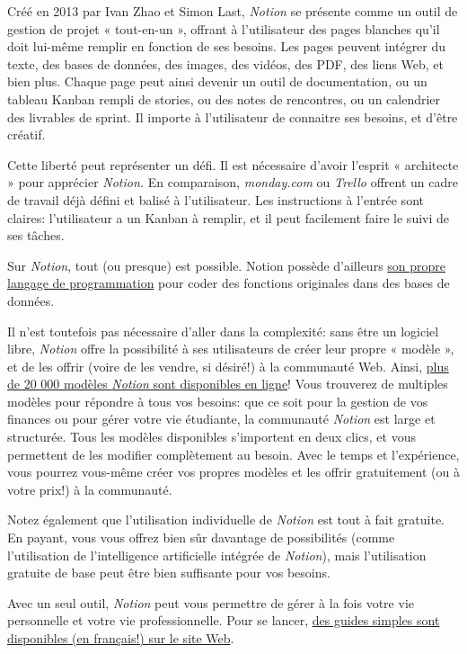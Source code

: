 \documentclass[
  letterpaper,
  DIV=11,
  numbers=noendperiod]{scrreprt}
\begin{document}
Créé en 2013 par Ivan Zhao et Simon Last, \emph{Notion} se présente
comme un outil de gestion de projet « tout-en-un », offrant à
l'utilisateur des pages blanches qu'il doit lui-même remplir en fonction
de ses besoins. Les pages peuvent intégrer du texte, des bases de
données, des images, des vidéos, des PDF, des liens Web, et bien plus.
Chaque page peut ainsi devenir un outil de documentation, ou un tableau
Kanban rempli de stories, ou des notes de rencontres, ou un calendrier
des livrables de sprint. Il importe à l'utilisateur de connaitre ses
besoins, et d'être créatif.

Cette liberté peut représenter un défi. Il est nécessaire d'avoir
l'esprit « architecte » pour apprécier \emph{Notion.} En comparaison,
\emph{monday.com} ou \emph{Trello} offrent un cadre de travail déjà
défini et balisé à l'utilisateur. Les instructions à l'entrée sont
claires: l'utilisateur a un Kanban à remplir, et il peut facilement
faire le suivi de ses tâches.

Sur \emph{Notion}, tout (ou presque) est possible. Notion possède
d'ailleurs \href{https://www.notion.so/fr/help/formulas}{son propre
langage de programmation} pour coder des fonctions originales dans des
bases de données.

Il n'est toutefois pas nécessaire d'aller dans la complexité: sans être
un logiciel libre, \emph{Notion} offre la possibilité à ses utilisateurs
de créer leur propre « modèle », et de les offrir (voire de les vendre,
si désiré!) à la communauté Web. Ainsi,
\href{https://www.notion.so/fr/templates}{plus de 20 000 modèles
\emph{Notion} sont disponibles en ligne}! Vous trouverez de multiples
modèles pour répondre à tous vos besoins: que ce soit pour la gestion de
vos finances ou pour gérer votre vie étudiante, la communauté
\emph{Notion} est large et structurée. Tous les modèles disponibles
s'importent en deux clics, et vous permettent de les modifier
complètement au besoin. Avec le temps et l'expérience, vous pourrez
vous-même créer vos propres modèles et les offrir gratuitement (ou à
votre prix!) à la communauté.

Notez également que l'utilisation individuelle de \emph{Notion} est tout
à fait gratuite. En payant, vous vous offrez bien sûr davantage de
possibilités (comme l'utilisation de l'intelligence artificielle
intégrée de \emph{Notion}), mais l'utilisation gratuite de base peut
être bien suffisante pour vos besoins.

Avec un seul outil, \emph{Notion} peut vous permettre de gérer à la fois
votre vie personnelle et votre vie professionnelle. Pour se lancer,
\href{https://www.notion.so/fr/help/category/new-to-notion}{des guides
simples sont disponibles (en français!) sur le site Web}.
\end{document}
